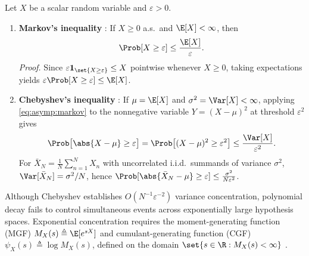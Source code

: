 \documentclass[../../../../master.tex]{subfiles}
\begin{document}
\begin{coremath}
Let $X$ be a scalar random variable and $\varepsilon > 0$.
\begin{enumerate}
  \item \textbf{Markov's inequality} : If $X \ge 0$ a.s.\ and $\E[X] < \infty$, then
  \begin{equation}
  \label{eq:asymp:markov}
  \Prob[X \ge \varepsilon] \le \frac{\E[X]}{\varepsilon}.
  \end{equation}
  \emph{Proof.} Since $\varepsilon \mathbf{1}_{\set{X \ge \varepsilon}} \le X$ pointwise whenever $X \ge 0$, taking expectations yields $\varepsilon \Prob[X \ge \varepsilon] \le \E[X]$.
  \item \textbf{Chebyshev's inequality} : If $\mu = \E[X]$ and $\sigma^2 = \Var[X] < \infty$, applying \eqref{eq:asymp:markov} to the nonnegative variable $Y = (X - \mu)^2$ at threshold $\varepsilon^2$ gives
  \begin{equation}
  \label{eq:asymp:chebyshev}
  \Prob\bigl[\abs{X - \mu} \ge \varepsilon\bigr] = \Prob\bigl[(X-\mu)^2 \ge \varepsilon^2\bigr] \le \frac{\Var[X]}{\varepsilon^2}.
  \end{equation}
  For $\bar{X}_N = \frac{1}{N}\sum_{n=1}^N X_n$ with uncorrelated i.i.d.\ summands of variance $\sigma^2$, $\Var[\bar{X}_N] = \sigma^2/N$, hence $\Prob[\abs{\bar{X}_N - \mu} \ge \varepsilon] \le \frac{\sigma^2}{N\varepsilon^2}$.
\end{enumerate}
\end{coremath}

Although Chebyshev establishes $O(N^{-1}\varepsilon^{-2})$ variance concentration, polynomial decay fails to control simultaneous events across exponentially large hypothesis spaces. Exponential concentration requires the moment-generating function (MGF) $M_X(s) \triangleq \E[e^{sX}]$ and cumulant-generating function (CGF) $\psi_X(s) \triangleq \log M_X(s)$, defined on the domain $\set{s \in \R : M_X(s) < \infty}$ .
\end{document}
